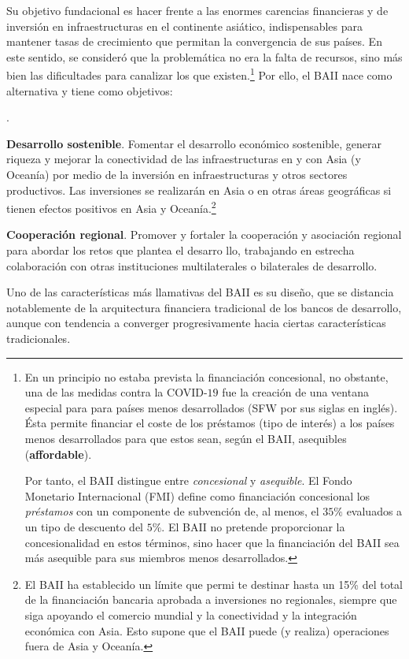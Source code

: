 \documentclass[10pt,a4paper]{article}
\newcounter{numitem}
\newenvironment{lnum}
      {\begin{list}{\arabic{numitem}.}{%
          \usecounter{numitem}%
          \setlength{\leftmargin}{1cm}%
          \setlength{\parskip}{3pt}%
          \setlength{\itemsep}{0pt}%
          \setlength{\parsep}{0pt}%
      }}
      {\end{list}}
\begin{document}
Su objetivo fundacional es hacer frente a las enormes carencias financieras y de inversión en infraestructuras en el continente asiático, indispensables para mantener tasas de crecimiento que permitan la convergencia de sus países. En este sentido, se consideró que la problemática no era la falta de recursos, sino más bien las dificultades para canalizar los que existen.\footnote{%
    En un principio no estaba prevista la financiación concesional, no obstante, una de las medidas contra la COVID-$19$ fue la creación de una ventana especial para para países menos desarrollados (SFW por sus siglas en inglés). Ésta permite financiar el coste de los préstamos (tipo de interés) a los países menos desarrollados para que estos sean, según el BAII, asequibles (\textbf{affordable}).

Por tanto, el BAII distingue entre \textit{concesional} y \textit{asequible}. El Fondo Monetario Internacional (FMI) define como financiación concesional los \textit{préstamos} con un componente de subvención de, al menos, el $35\%$ evaluados a un tipo de descuento del $5\%$. El BAII no pretende proporcionar la concesionalidad en estos términos, sino hacer que la financiación del BAII sea más asequible para sus miembros menos desarrollados.
} Por ello, el BAII nace como alternativa y tiene como objetivos:
\begin{lnum}
    \item \textbf{Desarrollo sostenible}. Fomentar el desarrollo económico sostenible, generar riqueza y mejorar la conectividad de las infraestructuras en y con Asia (y Oceanía) por medio de la inversión en infraestructuras y otros sectores productivos. Las inversiones se realizarán en Asia o en otras áreas geográficas si tienen efectos positivos en Asia y Oceanía.\footnote{%
        El BAII ha establecido un límite que permi te destinar hasta un 15\% del total de la financiación bancaria aprobada a inversiones no regionales, siempre que siga apoyando el comercio mundial y la conectividad y la integración económica con Asia. Esto supone que el BAII puede (y realiza) operaciones fuera de Asia y Oceanía.
    }
    \item \textbf{Cooperación regional}. Promover y fortaler la cooperación y asociación regional para abordar los retos que plantea el desarro llo, trabajando en estrecha colaboración con otras instituciones multilaterales o bilaterales de desarrollo. 
\end{lnum}

Uno de las características más llamativas del BAII es su diseño, que se distancia notablemente de la arquitectura financiera tradicional de los bancos de desarrollo, aunque con tendencia a converger progresivamente hacia ciertas características tradicionales. 
\end{document}
